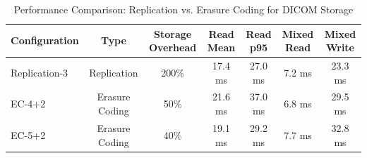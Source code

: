 
\begin{table}[htbp]
\centering
\caption{Performance Comparison: Replication vs. Erasure Coding for DICOM Storage}
\label{tab:storage_comparison}
\begin{tabular}{lcccccc}
\toprule
\textbf{Configuration} & \textbf{Type} & \textbf{Storage Overhead} & \textbf{Read Mean} & \textbf{Read p95} & \textbf{Mixed Read} & \textbf{Mixed Write} \\
\midrule
Replication-3 & Replication & 200\% & 17.4 ms & 27.0 ms & 7.2 ms & 23.3 ms \\
EC-4+2 & Erasure Coding & 50\% & 21.6 ms & 37.0 ms & 6.8 ms & 29.5 ms \\
EC-5+2 & Erasure Coding & 40\% & 19.1 ms & 29.2 ms & 7.7 ms & 32.8 ms \\

\bottomrule
\end{tabular}
\end{table}
